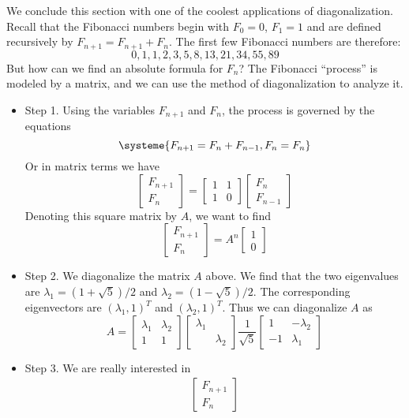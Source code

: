\documentclass[11pt,oneside]{amsbook}
\theoremstyle{definition}
\theoremstyle{plain}
\theoremstyle{definition}
\theoremstyle{remark}
\numberwithin{equation}{section}
\numberwithin{figure}{section}
\begin{document}
We conclude this section with one of the coolest applications of diagonalization. Recall that the Fibonacci numbers begin with $F_0=0$, $F_1=1$ and are defined recursively by $F_{n+1}=F_{n+1}+F_n$. The first few Fibonacci numbers are therefore:
\[0,1,1,2,3,5,8,13,21,34,55,89
\]
But how can we find an absolute formula for $F_n$? The Fibonacci ``process'' is modeled by a matrix, and we can use the method of diagonalization to analyze it.
\begin{itemize}
  \item Step 1. Using the variables $F_{n+1}$ and $F_n$, the process is governed by the equations
  \[\systeme{F_{n+1}=F_n+F_{n-1},F_n=F_n}
  \]
  Or in matrix terms we have
  \[\begin{bmatrix}F_{n+1}\\F_n\end{bmatrix}
    =\begin{bmatrix}1&1\\1&0\end{bmatrix}
    \begin{bmatrix}F_n\\F_{n-1}\end{bmatrix}
  \]
  Denoting this square matrix by $A$, we want to find
  \[\begin{bmatrix}F_{n+1}\\F_n\end{bmatrix}
    =A^n\begin{bmatrix}1\\0\end{bmatrix}
  \]
  \item Step 2. We diagonalize the matrix $A$ above. We find that the two eigenvalues are $\lambda_1=(1+\sqrt{5})/2$ and $\lambda_2=(1-\sqrt{5})/2$. The corresponding eigenvectors are $(\lambda_1,1)^T$ and $(\lambda_2,1)^T$. Thus we can diagonalize $A$ as
  \[A=\begin{bmatrix}\lambda_1&\lambda_2\\1&1\end{bmatrix}
    \begin{bmatrix}\lambda_1\\&\lambda_2\end{bmatrix}
    \frac{1}{\sqrt{5}}
    \begin{bmatrix}1&-\lambda_2\\-1&\lambda_1\end{bmatrix}
    \]
  \item Step 3. We are really interested in
  \begin{align*}
    \begin{bmatrix}F_{n+1}\\F_n\end{bmatrix}

\end{align*}
\end{itemize}
\end{document}
